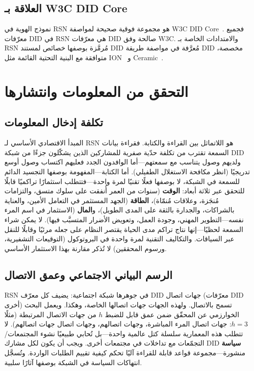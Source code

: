 \documentclass[11pt,a4paper,twocolumn]{article}
\begin{document}
\subsection{العلاقة بـ W3C DID Core}

نموذج الهوية في RSN هو مجموعة فوقية صحيحة لمواصفة W3C DID Core~\cite{did2022}. فجميع معرّفات DID في RSN هي معرّفات DID صالحة وفق W3C. والامتدادات الخاصة بـ RSN مُرمَّزة بوصفها خصائص لمستند DID مُعرَّفة في مواصفة طريقة DID مخصصة، متوافقة مع البنية التحتية القائمة مثل ION~\cite{buchner2021} و Ceramic~\cite{ceramic2023}.

\section{التحقق من المعلومات وانتشارها}

\subsection{تكلفة إدخال المعلومات}

المبدأ الاقتصادي الأساسي لـ RSN هو اللاتماثل بين القراءة والكتابة. فقراءة بيانات السمعة تقترب من تكلفة حدّية صفرية للمشاركين الذين يشكّلون جزءًا من شبكة DID ولديهم وصول يتناسب مع سمعتهم---أما الوافدون الجدد فعليهم اكتساب وصول أوسع تدريجيًا (انظر مكافحة الاستغلال الطفيلي). أما الكتابة---المفهومة بوصفها التجسيد الدائم للسمعة في الشبكة، لا بوصفها فعلًا تقنيًا لمرة واحدة---فتتطلب استثمارًا تراكميًا قابلًا للتحقق عبر ثلاثة أبعاد: \textbf{الوقت} (سنوات من العمر أُنفقت على سلوك متسق، والتزامات مُنجَزة، وعلاقات مُنمّاة)، \textbf{الطاقة} (الجهد المستثمر في التعامل الأمين، والعناية بالشراكات، والجدارة بالثقة على المدى الطويل)، و\textbf{المال} (الاستثمار في اسم المرء نفسه---التطوير المهني، وجودة العمل، وتعويض الأضرار المتسبَّب فيها). لا يمكن شراء السمعة لحظيًا---إنها نتاج تراكم مدى الحياة يقتصر النظام على جعله مرئيًا وقابلًا للنقل عبر السياقات. والتكاليف التقنية لمرة واحدة في البروتوكول (التوقيعات التشفيرية، ورسوم المحققين) لا تُذكر مقارنة بهذا الاستثمار الأساسي.

\subsection{الرسم البياني الاجتماعي وعمق الاتصال}

RSN في جوهرها شبكة اجتماعية: يضيف كل معرّف DID جهات اتصال (معرّفات DID أخرى) تسمح بالاتصال. ولهذه الجهات جهات اتصالها الخاصة، وهكذا. ويعمل البحث الخوارزمي عن المحقّق ضمن عمق قابل للضبط $h$ من جهات الاتصال المرتبطة (مثلًا $h=3$: جهات اتصال المرء المباشرة، وجهات اتصالهم، وجهات اتصال جهات اتصالهم). لا تتطلب هذه المعمارية سلسلة كتل عالمية واحدة---بل تُحابي طبيعيًا نشوء المجتمعات/التجمّعات مع تداخلات في مجتمعات أخرى. ويجب أن يكون لكل مشارك DID \textbf{سياسة} منشورة---مجموعة قواعد قابلة للقراءة آليًا تحكم كيفية تقييم الطلبات الواردة. وتُسجَّل انتهاكات السياسة في الشبكة بوصفها آثارًا سلبية.
\end{document}
